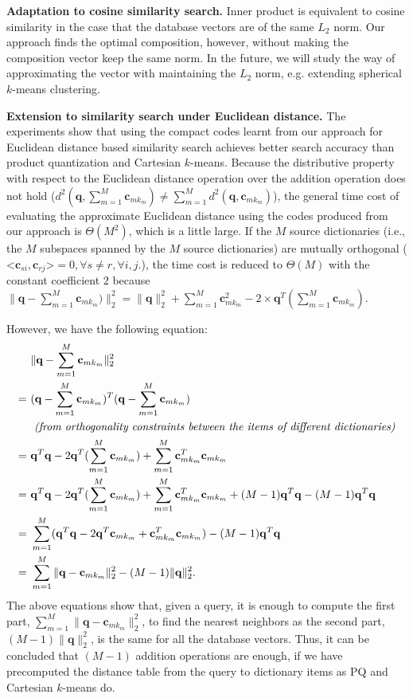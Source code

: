 \documentclass[10pt, letterpaper]{article}
\begin{document}
\noindent\textbf{Adaptation to cosine similarity search.}
Inner product is equivalent to cosine similarity
in the case that the database vectors
are of the same $L_2$ norm.
Our approach
finds the optimal composition,
however,
without making
the composition vector keep the same norm.
In the future,
we will study the way
of approximating the vector
with maintaining the $L_2$ norm,
e.g. extending spherical $k$-means clustering.


\noindent\textbf{Extension to similarity search under Euclidean distance.}
The experiments show
that using the compact codes learnt from our approach
for Euclidean distance based similarity search
achieves better search accuracy
than product quantization and Cartesian $k$-means.
Because the distributive property
with respect to the Euclidean distance operation
over the addition operation does not hold
($d^2(\mathbf{q}, \sum_{m=1}^M\mathbf{c}_{mk_m})
\neq \sum_{m=1}^M d^2(\mathbf{q}, \mathbf{c}_{mk_m}) $),
the general time cost
of evaluating the approximate Euclidean distance
using the codes produced from our approach
is $\Theta(M^2)$,
which is a little large.
If the $M$ source dictionaries
(i.e., the $M$ subspaces spanned by the $M$ source dictionaries)
are mutually orthogonal
($\texttt{<}\mathbf{c}_{si}, \mathbf{c}_{rj}\texttt{>}= 0,
\forall s \neq r, \forall i, j$.),
the time cost is reduced to $\Theta(M)$
with the constant coefficient $2$
because $\|\mathbf{q} - \sum_{m=1}^M\mathbf{c}_{mk_m})\|_2^2 =
\|\mathbf{q}\|_2^2 + \sum_{m=1}^M \mathbf{c}^2_{mk_m}
- 2 \times \mathbf{q}^T(\sum_{m=1}^M\mathbf{c}_{mk_m})$.

However, we have the following equation:
\begin{align}
& \|\mathbf{q} - \sum_{m=1}^M\mathbf{c}_{mk_m}\|_2^2 \\
=~& (\mathbf{q} - \sum_{m=1}^M\mathbf{c}_{mk_m})^T(\mathbf{q} - \sum_{m=1}^M\mathbf{c}_{mk_m}) \\
&~\text{\emph {(from orthogonality constraints between the items of different dictionaries)}}\\
=~& \mathbf{q}^T\mathbf{q} - 2  \mathbf{q}^T(\sum_{m=1}^M\mathbf{c}_{mk_m}) + \sum_{m=1}^M \mathbf{c}^T_{mk_m}\mathbf{c}_{mk_m}\\
=~& \mathbf{q}^T\mathbf{q} - 2  \mathbf{q}^T(\sum_{m=1}^M\mathbf{c}_{mk_m}) + \sum_{m=1}^M \mathbf{c}^T_{mk_m}\mathbf{c}_{mk_m}+(M-1)\mathbf{q}^T\mathbf{q}-(M-1)\mathbf{q}^T\mathbf{q} \\
=~&
\sum_{m=1}^M(\mathbf{q}^T\mathbf{q} - 2\mathbf{q}^T\mathbf{c}_{mk_m} + \mathbf{c}^T_{mk_m}\mathbf{c}_{mk_m})-(M-1)\mathbf{q}^T\mathbf{q} \\
=~&
\sum_{m=1}^M\|\mathbf{q} - \mathbf{c}_{mk_m}\|_2^2 - (M-1)\|\mathbf{q}\|_2^2.
\end{align}
The above equations show that,
given a query,
it is enough to compute the first part,
$\sum_{m=1}^M\|\mathbf{q} - \mathbf{c}_{mk_m}\|_2^2$,
to find the nearest neighbors
as the second part,
$(M-1)\|\mathbf{q}\|_2^2$,
is the same
for all the database vectors.
Thus, it can be concluded
that $(M-1)$ addition operations are enough,
if we have precomputed the distance table
from the query to dictionary items
as PQ and Cartesian $k$-means do.
\end{document}
